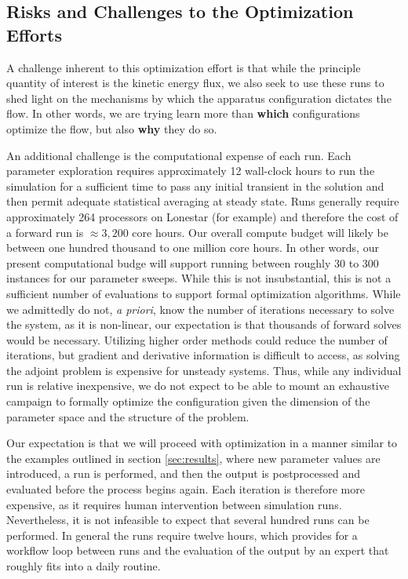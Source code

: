 \subsection{Risks and Challenges to the Optimization Efforts}

A challenge inherent to this optimization effort is that while the
principle quantity of interest is the kinetic energy flux, we also seek
to use these runs to shed light on the mechanisms by which the apparatus
configuration dictates the flow. In other words, we are trying learn
more than \textbf{which} configurations optimize the flow, but also 
\textbf{why} they do so. 


%
%
An additional challenge is the computational expense of each run. Each
parameter exploration requires approximately 12 wall-clock hours to run
the simulation for a sufficient time to pass any initial transient in
the solution and then permit adequate statistical averaging at steady
state. Runs generally require approximately 264 processors on Lonestar
(for example) and therefore the cost of a forward run is $\approx 3,200$
core hours. Our overall compute budget will likely be between one hundred
thousand to one million core hours. In other words, our present
computational budge will support running between roughly 30 to 300
instances for our parameter sweeps. While this is not insubstantial, this
is not a sufficient number of evaluations to support formal
optimization algorithms. While we admittedly do not, \textit{a priori},
know the number of iterations necessary to solve the system, as it is
non-linear, our expectation is that thousands of forward solves would be
necessary. Utilizing higher order methods could reduce the number of
iterations, but gradient and derivative information is difficult to
access, as solving the adjoint problem is expensive for unsteady systems. 
Thus, while any individual run is relative inexpensive, we do not expect
to be able to mount an exhaustive campaign to formally optimize the
configuration given the dimension of the parameter space and the
structure of the problem. 

%
%
Our expectation is that we will proceed with optimization in a manner
similar to the examples outlined in section \ref{sec:results}, where new
parameter values are introduced, a run is performed, and then the output
is postprocessed and evaluated before the process begins again. Each
iteration is therefore more expensive, as it requires human
intervention between simulation runs. Nevertheless, it is not infeasible
to expect that several hundred runs can be performed. In general the
runs require twelve hours, which provides for a workflow loop between
runs and the evaluation of the output by an expert that roughly fits
into a daily routine.

